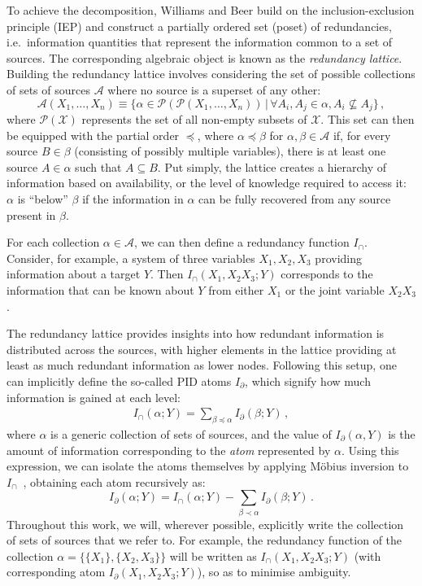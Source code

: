 \documentclass{article}
\newcommand{\Xs}{X_1,\ldots,X_n}
\newcommand{\Ic}{\ensuremath{I_\cap}\xspace}
\begin{document}
To achieve the decomposition, Williams and Beer build on the inclusion-exclusion principle (IEP) and construct a partially ordered set (poset) of redundancies, i.e.\ information quantities that represent the information common to a set of sources. The corresponding algebraic object is known as the \textit{redundancy lattice}. Building the redundancy lattice involves considering the set of possible collections of sets of sources $\mathcal{A}$ where no source is a superset of any other:
\begin{equation}
    \mathcal{A}(\Xs) \equiv \{ \alpha\in\mathcal{P}(\mathcal{P}(\Xs)) \,|\, \forall A_i,A_j\in\alpha, A_i\not\subseteq A_j\} \,,
\end{equation}
where $\mathcal{P}(\mathcal{X})$ represents the set of all non-empty subsets of $\mathcal{X}$. This set can then be equipped with the partial order $\preceq$, where $\alpha \preceq \beta$ for $\alpha, \beta \in \mathcal{A}$ if, for every source $B \in \beta$ (consisting of possibly multiple variables), there is at least one source $A \in \alpha$ such that $A \subseteq B$. Put simply, the lattice creates a hierarchy of information based on availability, or the level of knowledge required to access it: $\alpha$ is ``below'' $\beta$ if the information in $\alpha$ can be fully recovered from any source present in $\beta$.

For each collection $\alpha\in\mathcal{A}$, we can then define a redundancy function $\Ic$. Consider, for example, a system of three variables $X_1, X_2, X_3$ providing information about a target $Y$. Then $\Ic(X_1,X_2X_3;Y)$ corresponds to the information that can be known about $Y$ from either $X_1$ or the joint variable $X_2X_3$.

The redundancy lattice provides insights into how redundant information is distributed across the sources, with higher elements in the lattice providing at least as much redundant information as lower nodes. Following this setup, one can implicitly define the so-called PID atoms $I_\partial$, which signify how much information is gained at each level:
\begin{align}\label{eq:PID_intersect_def}
    \Ic(\alpha;Y) = \sum_{\beta\preceq\alpha} I_\partial(\beta;Y) \,,
\end{align}
where $\alpha$ is a generic collection of sets of sources, and the value of $I_\partial(\alpha, Y)$ is the amount of information corresponding to the \textit{atom} represented by $\alpha$. Using this expression, we can isolate the atoms themselves by applying M{\"o}bius inversion to $\Ic$~\cite{rota1964foundations, jansma2025fast}, obtaining each atom recursively as:
\begin{equation} \label{eq:PID_partial_def}
    I_\partial(\alpha;Y) = \Ic(\alpha;Y) - \sum_{\beta\prec\alpha} I_\partial(\beta;Y) \,.
\end{equation}
Throughout this work, we will, wherever possible, explicitly write the collection of sets of sources that we refer to. For example, the redundancy function of the collection $\alpha=\{\{X_1\},\{X_2,X_3\}\}$ will be written as $\Ic(X_1,X_2X_3;Y)$ (with corresponding atom $I_\partial(X_1,X_2X_3;Y)$), so as to minimise ambiguity.
\end{document}
